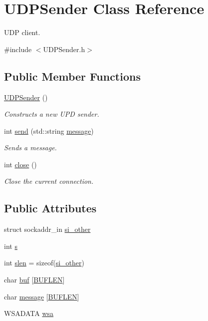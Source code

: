 \hypertarget{class_u_d_p_sender}{}\section{U\+D\+P\+Sender Class Reference}
\label{class_u_d_p_sender}


U\+DP client.  




{\ttfamily \#include $<$U\+D\+P\+Sender.\+h$>$}

\subsection*{Public Member Functions}
\begin{DoxyCompactItemize}
\item 
\hyperlink{class_u_d_p_sender_a77c0f2eb66dbc9a912b4fede20de3f03}{U\+D\+P\+Sender} ()
\begin{DoxyCompactList}\small\item\em Constructs a new U\+PD sender. \end{DoxyCompactList}\item 
int \hyperlink{class_u_d_p_sender_a33d402a42a2d512bd12189e1f698cca4}{send} (std\+::string \hyperlink{class_u_d_p_sender_a738a29b72c2c7fe5655e74cd4ee0e077}{message})
\begin{DoxyCompactList}\small\item\em Sends a message. \end{DoxyCompactList}\item 
int \hyperlink{class_u_d_p_sender_a9633801c0b923a53d42061f2233d06ef}{close} ()
\begin{DoxyCompactList}\small\item\em Close the current connection. \end{DoxyCompactList}\end{DoxyCompactItemize}
\subsection*{Public Attributes}
\begin{DoxyCompactItemize}
\item 
struct sockaddr\+\_\+in \hyperlink{class_u_d_p_sender_abeda008425d14ea8092d23d23bbd1117}{si\+\_\+other}
\item 
int \hyperlink{class_u_d_p_sender_aeb3773ffb3bc9549dbe73c0e7fee0f23}{s}
\item 
int \hyperlink{class_u_d_p_sender_a44e4545b002409e774edb7e30653d53e}{slen} = sizeof(\hyperlink{class_u_d_p_sender_abeda008425d14ea8092d23d23bbd1117}{si\+\_\+other})
\item 
char \hyperlink{class_u_d_p_sender_a21073b873007a83ac5bec30bcce8fd43}{buf} \mbox{[}\hyperlink{_u_d_p_sender_8h_ad974fe981249f5e84fbf1683b012c9f8}{B\+U\+F\+L\+EN}\mbox{]}
\item 
char \hyperlink{class_u_d_p_sender_a738a29b72c2c7fe5655e74cd4ee0e077}{message} \mbox{[}\hyperlink{_u_d_p_sender_8h_ad974fe981249f5e84fbf1683b012c9f8}{B\+U\+F\+L\+EN}\mbox{]}
\item 
W\+S\+A\+D\+A\+TA \hyperlink{class_u_d_p_sender_afc9fc0d12ba056af8f66ee738c5bbe98}{wsa}
\end{DoxyCompactItemize}


